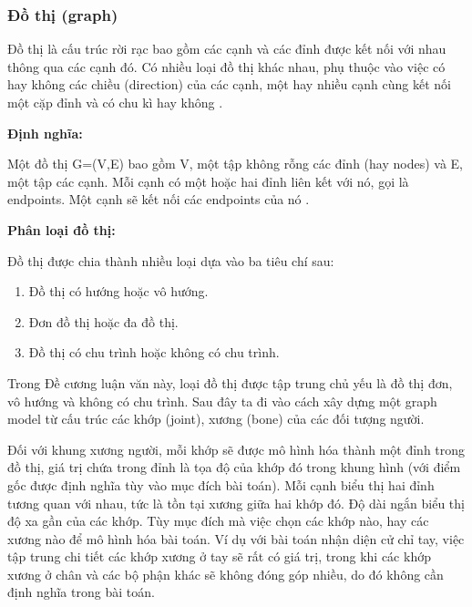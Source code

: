 
\subsubsection{Đồ thị (graph)}

Đồ thị là cấu trúc rời rạc bao gồm các cạnh và các đỉnh được kết nối với nhau thông qua các cạnh đó. Có nhiều loại đồ thị khác nhau, phụ thuộc vào việc có hay không các chiều (direction) của các cạnh, một hay nhiều cạnh cùng kết nối một cặp đỉnh và có chu kì hay không \cite{rosen2012discrete}.

\textbf{Định nghĩa:}

Một đồ thị G=(V,E) bao gồm V, một tập không rỗng các đỉnh (hay nodes) và E, một tập các cạnh. Mỗi cạnh có một hoặc hai đỉnh liên kết với nó, gọi là endpoints. Một cạnh sẽ kết nối các endpoints của nó \cite{rosen2012discrete}.

\textbf{Phân loại đồ thị:}

Đồ thị được chia thành nhiều loại dựa vào ba tiêu chí sau:
\begin{enumerate}
    \item Đồ thị có hướng hoặc vô hướng.
    \item Đơn đồ thị hoặc đa đồ thị.
    \item Đồ thị có chu trình hoặc không có chu trình.
\end{enumerate}

Trong Đề cương luận văn này, loại đồ thị được tập trung chủ yếu là đồ thị đơn, vô hướng và không có chu trình. Sau đây ta đi vào cách xây dựng một graph model từ cấu trúc các khớp (joint), xương (bone) của các đối tượng người.

Đối với khung xương người, mỗi khớp sẽ được mô hình hóa thành một đỉnh trong đồ thị, giá trị chứa trong đỉnh là tọa độ của khớp đó trong khung hình (với điểm gốc được định nghĩa tùy vào mục đích bài toán). Mỗi cạnh biểu thị hai đỉnh tương quan với nhau, tức là tồn tại xương giữa hai khớp đó. Độ dài ngắn biểu thị độ xa gần của các khớp. Tùy mục đích mà việc chọn các khớp nào,  hay các xương nào để  mô hình hóa bài toán. Ví dụ với bài toán nhận diện cử chỉ tay, việc tập trung chi tiết các khớp xương ở tay sẽ rất có giá trị, trong khi các khớp xương ở chân và các bộ phận khác sẽ không đóng góp nhiều, do đó không cần định nghĩa trong bài toán.

